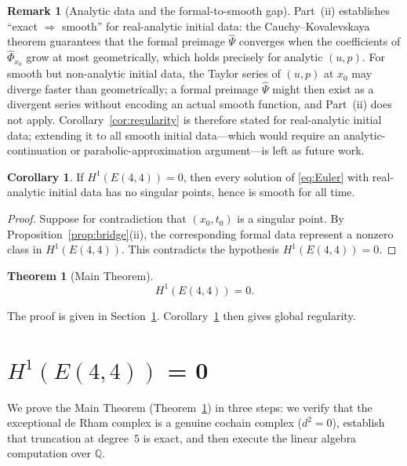 \documentclass[reqno,10pt]{amsart}
\theoremstyle{definition}
\newtheorem{theor}[subsubsection]{Theorem}
\newtheorem{cor}[subsubsection]{Corollary}
\newtheorem{rem}[subsubsection]{Remark}
\begin{document}
\begin{rem}[Analytic data and the formal-to-smooth gap]\label{rem:exact-not-smooth}
Part~(ii) establishes ``exact $\Rightarrow$ smooth'' for real-analytic initial
data: the Cauchy--Kovalevskaya theorem guarantees that the formal preimage
$\widehat{\Psi}$ converges when the coefficients of $\widehat{\Phi}_{x_0}$
grow at most geometrically, which holds precisely for analytic $(u,p)$.
For smooth but non-analytic initial data, the Taylor series of $(u,p)$ at
$x_0$ may diverge faster than geometrically; a formal preimage $\widehat{\Psi}$
might then exist as a divergent series without encoding an actual smooth
function, and Part~(ii) does not apply.  Corollary~\ref{cor:regularity} is
therefore stated for real-analytic initial data; extending it to all smooth
initial data---which would require an analytic-continuation or parabolic-approximation
argument---is left as future work.
\end{rem}

\begin{cor}\label{cor:bridge}
If $H^1(E(4,4))=0$, then every solution of \eqref{eq:Euler} with
real-analytic initial data has no singular points, hence is smooth for all time.
\end{cor}

\begin{proof}
Suppose for contradiction that $(x_0,t_0)$ is a singular point.  By
Proposition~\ref{prop:bridge}(ii), the corresponding formal data represent
a nonzero class in $H^1(E(4,4))$.  This contradicts the hypothesis
$H^1(E(4,4))=0$.
\end{proof}

\begin{theor}[Main Theorem]\label{thm:main}
\[
  H^1(E(4,4)) = 0.
\]
\end{theor}

The proof is given in Section~\ref{sec:h1-vanish}.
Corollary~\ref{cor:bridge} then gives global regularity.

\section{$H^1(E(4,4))$ = 0}
\label{sec:h1-vanish}
We prove the Main Theorem (Theorem~\ref{thm:main}) in three steps: we verify
that the exceptional de Rham complex is a genuine cochain complex ($d^2=0$),
establish that truncation at degree~$5$ is exact, and then execute the linear
algebra computation over $\mathbb{Q}$.
\end{document}
